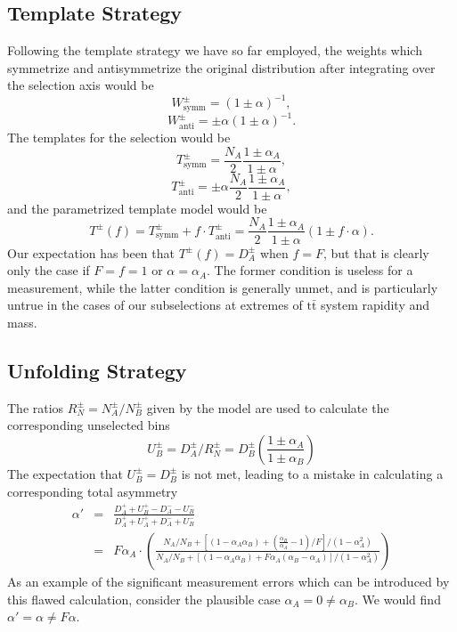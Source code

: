 \documentclass[letterpaper,11pt]{article}
\begin{document}
\subsection{Template Strategy}
Following the template strategy we have so far employed, the weights
which symmetrize and antisymmetrize the original distribution after
integrating over the selection axis would be
\[W^\pm_{\mathrm{symm}} = (1\pm\alpha)^{-1},\]
\[W^\pm_{\mathrm{anti}} = \pm\alpha(1\pm\alpha)^{-1}.\]
The templates for the selection would be
\[T^{\pm}_{\mathrm{symm}} = \frac{N_A}{2}\frac{1\pm\alpha_A}{1\pm\alpha},\]
\[T^{\pm}_{\mathrm{anti}} = \pm\alpha\frac{N_A}{2}\frac{1\pm\alpha_A}{1\pm\alpha},\]
and the parametrized template model would be
\[T^{\pm}(f) = T^{\pm}_{\mathrm{symm}} + f\cdot T^\pm_{\mathrm{anti}} = \frac{N_A}{2}\frac{1\pm\alpha_A}{1\pm\alpha}(1\pm f\cdot\alpha).\]
Our expectation has been that $T^\pm(f) = D^\pm_A$ when $f=F$, but
that is clearly only the case if $F=f=1$ or $\alpha=\alpha_A$.  The
former condition is useless for a measurement, while the latter
condition is generally unmet, and is particularly untrue in the cases
of our subselections at extremes of $\mathrm{t\bar{t}}$ system
rapidity and mass.

\subsection{Unfolding Strategy}
The ratios $R_N^{\pm}=N^{\pm}_A/N^{\pm}_B$ given by the model are used
to calculate the corresponding unselected bins
\[U^{\pm}_B = D^{\pm}_A/R^\pm_N = D^\pm_B\left(\frac{1\pm\alpha_A}{1\pm\alpha_B}\right)\]
The expectation that $U^\pm_B=D^\pm_B$ is not met, leading to a
mistake in calculating a corresponding total asymmetry
\begin{eqnarray*}
  \alpha' &=& \frac{D^+_A+U^+_B - D^-_A -
    U^-_B}{D^+_A+U^+_A+D^-_A+U^-_B}\\
  &=& F \alpha_A\cdot \left(\frac{N_A/N_B + \left[(1-\alpha_A\alpha_B) + \left(\frac{\alpha_B}{\alpha_A}-1\right)/F\right]/(1-\alpha_A^2)}{N_A/N_B+\left[\left(1-\alpha_A\alpha_B\right)+F\alpha_A\left(\alpha_B-\alpha_A\right)\right]/(1-\alpha_A^2)}\right)
\end{eqnarray*}
As an example of the significant measurement errors which can be
introduced by this flawed calculation, consider the plausible case
$\alpha_A=0\ne\alpha_B$.  We would find $\alpha' = \alpha \ne F\alpha$.
\end{document}
